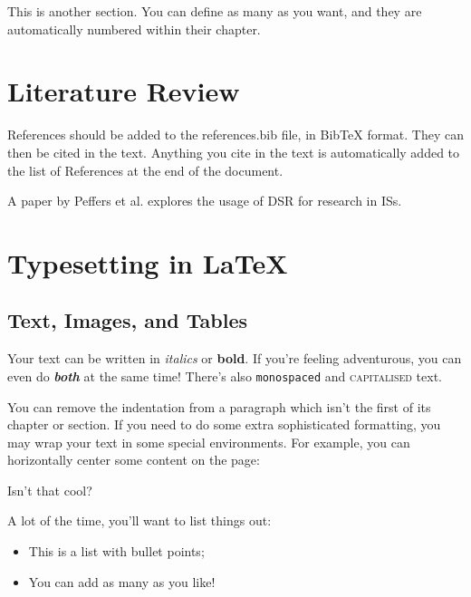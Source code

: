 \documentclass[12pt,reqno,twoside]{amsbook}
\begin{document}
This is another section. You can define as many as you want, and they are automatically numbered within their chapter.










\chapter{Literature Review}\label{ch:literature_review}

References should be added to the references.bib file, in BibTeX format. They can then be cited in the text. Anything you cite in the text is automatically added to the list of References at the end of the document.

A paper by Peffers et al. \cite{Peffers2007} explores the usage of \ac{DSR} for research in \acp{IS}.










\chapter{Typesetting in \LaTeX}\label{ch:typesetting}

\section{Text, Images, and Tables}\label{sec:text_images_tables}

Your text can be written in \textit{italics} or \textbf{bold}. If you're feeling adventurous, you can even do \textit{\textbf{both}} at the same time! There's also \texttt{monospaced} and \textsc{capitalised} text.

\noindent You can remove the indentation from a paragraph which isn't the first of its chapter or section. If you need to do some extra sophisticated formatting, you may wrap your text in some special environments. For example, you can horizontally center some content on the page:
\begin{center}
    Isn't that cool?
\end{center}

\noindent A lot of the time, you'll want to list things out:
\begin{itemize}
    \item This is a list with bullet points;
    \item You can add as many as you like!
\end{itemize}
\end{document}
